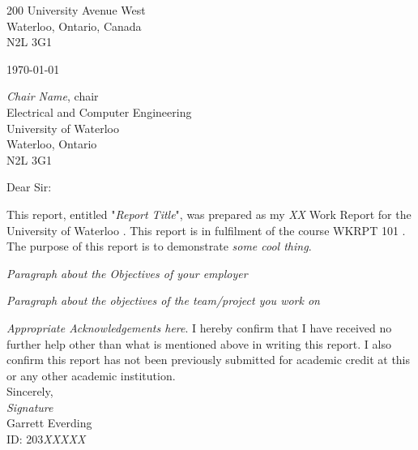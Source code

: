 200 University Avenue West \\
Waterloo, Ontario, Canada \\
N2L 3G1 

\today 

\emph{Chair Name}, chair \\
Electrical and Computer Engineering \\
University of Waterloo \\
Waterloo, Ontario \\
N2L 3G1  

Dear Sir: 

This report, entitled "\emph{Report Title}", was prepared as my \emph{XX} Work Report for the University of Waterloo . This report is in fulfilment of the course WKRPT 101 . The purpose of this report is to demonstrate \emph{some cool thing}.  

\emph{Paragraph about the Objectives of your employer}

\emph{Paragraph about the objectives of the team/project you work on}

\emph{Appropriate Acknowledgements here}.  I hereby confirm that I have received no further help other than what is mentioned above in writing this report. I also confirm this report has not been previously submitted for academic credit at this or any other academic institution.
\\

Sincerely, \\

\emph{Signature} \\

Garrett Everding \\
ID: 203\emph{XXXXX}

\pagebreak
